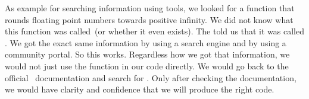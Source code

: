As example for searching information using  tools, we looked for a function that rounds floating point numbers towards positive infinity.
We did not know what this function was called~(or whether it even exists).
The  told us that it was called .
We got the exact same information by using a search engine and by using a community portal.
So this works.
Regardless how we got that information, we would not just use the function  in our code directly.
We would go back to the official \python\ documentation and search for .
Only after checking the documentation, we would have clarity and confidence that we will produce the right code.%
\endhsection%
%
\FloatBarrier%
\endhsection%
%
